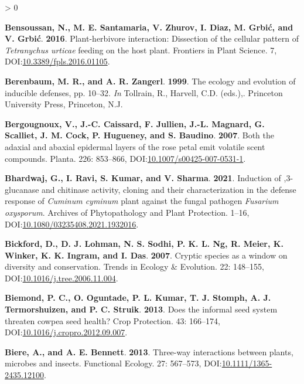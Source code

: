 \documentclass{ufdissertation}[overrideChapters] %
\newlength{\cslhangindent}
\newenvironment{CSLReferences}[2] %
 {%
  \setlength{\parindent}{0pt}
  \ifodd #1 \everypar{\setlength{\hangindent}{\cslhangindent}}\ignorespaces\fi
  \ifnum #2 > 0
  \setlength{\parskip}{#2\baselineskip}
  \fi
 }%
 {}
\begin{document}
{\begin{CSLReferences}{1}{1}
\leavevmode{}%
\textbf{Bensoussan, N., M. E. Santamaria, V. Zhurov, I. Diaz, M. Grbić, and V. Grbić}. \textbf{2016}. Plant-herbivore interaction: Dissection of the cellular pattern of {\emph{Tetranychus urticae}} feeding on the host plant. Frontiers in Plant Science. 7, DOI:\href{https://doi.org/10.3389/fpls.2016.01105}{10.3389/fpls.2016.01105}.

\leavevmode{}%
\textbf{Berenbaum, M. R., and A. R. Zangerl}. \textbf{1999}. The ecology and evolution of inducible defenses, pp. 10--32. \emph{In} Tollrain, R., Harvell, C.D. (eds.),. Princeton University Press, Princeton, N.J.

\leavevmode{}%
\textbf{Bergougnoux, V., J.-C. Caissard, F. Jullien, J.-L. Magnard, G. Scalliet, J. M. Cock, P. Hugueney, and S. Baudino}. \textbf{2007}. Both the adaxial and abaxial epidermal layers of the rose petal emit volatile scent compounds. Planta. 226: 853--866, DOI:\href{https://doi.org/10.1007/s00425-007-0531-1}{10.1007/s00425-007-0531-1}.

\leavevmode{}%
\textbf{Bhardwaj, G., I. Ravi, S. Kumar, and V. Sharma}. \textbf{2021}. Induction of ,3-glucanase and chitinase activity, cloning and their characterization in the defense response of {\emph{Cuminum cyminum}} plant against the fungal pathogen {\emph{Fusarium oxysporum}}. Archives of Phytopathology and Plant Protection. 1--16, DOI:\href{https://doi.org/10.1080/03235408.2021.1932016}{10.1080/03235408.2021.1932016}.

\leavevmode{}%
\textbf{Bickford, D., D. J. Lohman, N. S. Sodhi, P. K. L. Ng, R. Meier, K. Winker, K. K. Ingram, and I. Das}. \textbf{2007}. Cryptic species as a window on diversity and conservation. Trends in Ecology {\&} Evolution. 22: 148--155, DOI:\href{https://doi.org/10.1016/j.tree.2006.11.004}{10.1016/j.tree.2006.11.004}.

\leavevmode{}%
\textbf{Biemond, P. C., O. Oguntade, P. L. Kumar, T. J. Stomph, A. J. Termorshuizen, and P. C. Struik}. \textbf{2013}. Does the informal seed system threaten cowpea seed health? Crop Protection. 43: 166--174, DOI:\href{https://doi.org/10.1016/j.cropro.2012.09.007}{10.1016/j.cropro.2012.09.007}.

\leavevmode{}%
\textbf{Biere, A., and A. E. Bennett}. \textbf{2013}. Three-way interactions between plants, microbes and insects. Functional Ecology. 27: 567--573, DOI:\href{https://doi.org/10.1111/1365-2435.12100}{10.1111/1365-2435.12100}.


\end{CSLReferences}}
\end{document}
